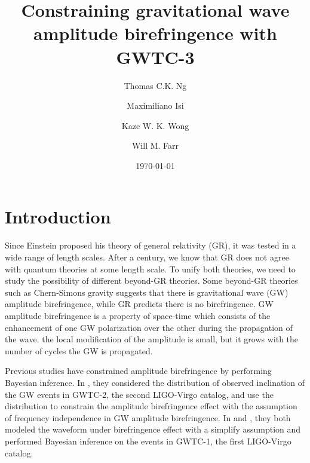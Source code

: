 \documentclass[reprint,amsmath,amssymb,aps,twocolumn]{aastex631}
\begin{document}
\title{Constraining gravitational wave amplitude birefringence with GWTC-3}

\author{Thomas C.K. Ng}

\author{Maximiliano Isi}

\author{Kaze W. K. Wong}

\author{Will M. Farr}

\date{\today}

\begin{abstract}

\end{abstract}

\section{Introduction}
\label{sec:Introduction}

Since Einstein proposed his theory of general relativity (GR), it was tested in a wide range of length scales.
After a century, we know that GR does not agree with quantum theories at some length scale.
To unify both theories, we need to study the possibility of different beyond-GR theories.
Some beyond-GR theories such as Chern-Simons gravity suggests that there is gravitational wave (GW) amplitude birefringence,
while GR predicts there is no birefringence.
GW amplitude birefringence is a property of space-time which consists of the enhancement of one GW polarization over the other during the propagation of the wave.
the local modification of the amplitude is small, but it grows with the number of cycles the GW is propagated.

Previous studies have constrained amplitude birefringence by performing Bayesian inference.
In \citet{Maria_2021}, they considered the distribution of observed inclination of the GW events in GWTC-2, the second LIGO-Virgo catalog,
and use the distribution to constrain the amplitude birefringence effect with the assumption of frequency independence in GW amplitude birefringence.
In \citet{Yamada_2020} and \citet{Wang_2021}, they both modeled the waveform under birefringence effect with a simplify assumption and
performed Bayesian inference on the events in GWTC-1, the first LIGO-Virgo catalog.
\end{document}
